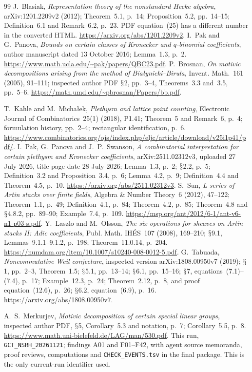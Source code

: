 \documentclass[11pt,a4paper]{article}
\renewcommand{\S}{\ensuremath{\mathsection}}
\theoremstyle{named}\newtheorem{finding}{Finding}[section]
\theoremstyle{definition}\newtheorem{definition}[finding]{Definition}
\theoremstyle{remark}\newtheorem{remark}[finding]{Remark}
\begin{document}
\begin{thebibliography}{99}
 J.~Blasiak, \emph{Representation theory of the nonstandard Hecke algebra}, arXiv:1201.2209v2 (2012); Theorem~5.1, p.~14; Proposition~5.2, pp.~14--15; Definition~6.1 and Remark~6.2, p.~23. PDF equation~(25) has a different number in the converted HTML. \url{https://arxiv.org/abs/1201.2209v2}.
 I.~Pak and G.~Panova, \emph{Bounds on certain classes of Kronecker and $q$-binomial coefficients}, author manuscript dated 13 October 2016; Lemma~1.3, p.~2. \url{https://www.math.ucla.edu/~pak/papers/QBC23.pdf}.
 P.~Brosnan, \emph{On motivic decompositions arising from the method of Bia\l ynicki--Birula}, Invent. Math.~161 (2005), 91--111; inspected author PDF \S2, pp.~3--4, Theorems~3.3 and~3.5, pp.~5--6. \url{https://math.umd.edu/~pbrosnan/Papers/bb.pdf}.


 T.~Kahle and M.~Micha{\l}ek, \emph{Plethysm and lattice point counting}, Electronic Journal of Combinatorics~25(1) (2018), P1.41; Theorem~5 and Remark~6, p.~4; formulation history, pp.~2--4; rectangular identification, p.~6. \url{https://www.combinatorics.org/ojs/index.php/eljc/article/download/v25i1p41/pdf/}.
 I.~Pak, G.~Panova and J.~P.~Swanson, \emph{A combinatorial interpretation for certain plethysm and Kronecker coefficients}, arXiv:2511.02312v3, uploaded 27 July 2026, title-page date 28 July 2026; Lemma~1.3, p.~2; \S2.2, p.~5; Definition~3.2 and Proposition~3.4, p.~6; Lemma~4.2, p.~9; Definition~4.4 and Theorem~4.5, p.~10. \url{https://arxiv.org/abs/2511.02312v3}.
 S.~Sun, \emph{L-series of Artin stacks over finite fields}, Algebra \& Number Theory~6 (2012), 47--122; Theorem~1.1, p.~49; Definition~4.1, p.~84; Theorem~4.2, p.~85; Theorem~4.8 and \S4.8.2, pp.~89--90; Example~7.4, p.~109. \url{https://msp.org/ant/2012/6-1/ant-v6-n1-p03-s.pdf}.
 Y.~Laszlo and M.~Olsson, \emph{The six operations for sheaves on Artin stacks II: Adic coefficients}, Publ. Math. IH\'ES~107 (2008), 169--210; \S9.1, Lemmas~9.1.1--9.1.2, p.~198; Theorem~11.0.14, p.~204. \url{https://numdam.org/item/10.1007/s10240-008-0012-5.pdf}.
 G.~Tabuada, \emph{Noncommutative Weil conjecture}, inspected version arXiv:1808.00950v7 (2019); \S1, pp.~2--3, Theorem~1.5; \S5.1, pp.~13--14; \S6.1, pp.~15--16; \S7, equations~(7.1)--(7.4), p.~17; Example~12.3, p.~24; Theorem~2.12, p.~8, and proof equation~(12.6), p.~26; \S6.2, equation~(6.9), p.~16. \url{https://arxiv.org/abs/1808.00950v7}.

 A.~S.~Merkurjev, \emph{Motivic decomposition of certain special linear groups}, inspected author PDF, \S5, Corollary~5.3 and notation, p.~7; Corollary~5.5, p.~8. \url{https://www.math.uni-bielefeld.de/LAG/man/530.pdf}.
 This run, \texttt{GCT\_NSRH\_20261121}; findings A01 and F01--F42, with agent source memoranda, proof reviews, computations and \texttt{CHECK\_EVENTS.tsv} in the final package. This is the only current-run identifier used.
\end{thebibliography}
\end{document}
